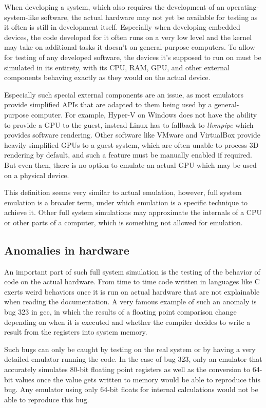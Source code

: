 When developing a system, which also requires the development of an operating-system-like
software, the actual hardware may not yet be available for testing
as it often is still in development itself.
Especially when developing embedded devices,
the code developed for it often runs on a very low level
and the kernel may take on additional tasks it doesn't on general-purpose computers.
To allow for testing of any developed software,
the devices it's supposed to run on must be simulated in its entirety,
with its CPU, RAM, GPU, and other external components behaving exactly as they would on the actual device.

Especially such special external components are an issue,
as most emulators provide simplified APIs that are adapted to them being used by a general-purpose computer.
For example, Hyper-V on Windows does not have the ability to provide a GPU to the guest,
instead Linux has to fallback to \emph{llvmpipe} which provides software rendering.
Other software like VMware and VirtualBox provide heavily simplified GPUs to a guest system,
which are often unable to process 3D rendering by default,
and such a feature must be manually enabled if required.
But even then, there is no option to emulate an actual GPU which may be used on a physical device.

This definition seems very similar to actual emulation,
however, full system emulation is a broader term, under which emulation is a specific technique to achieve it.
Other full system simulations may approximate the internals of a CPU or other parts of a computer,
which is something not allowed for emulation.

\subsection{Anomalies in hardware}
An important part of such full system simulation is the testing of the behavior of code on the actual hardware.
From time to time code written in languages like C exerts weird behaviors once it is run on actual hardware
that are not explainable when reading the documentation.
A very famous example of such an anomaly is bug 323\cite{323} in gcc,
in which the results of a floating point comparison change depending on when it is executed
and whether the compiler decides to write a result from the registers into system memory.

Such bugs can only be caught by testing on the real system
or by having a very detailed emulator running the code.
In the case of bug 323, only an emulator that accurately simulates 80-bit floating point registers
as well as the conversion to 64-bit values once the value gets written to memory
would be able to reproduce this bug.
Any emulator using only 64-bit floats for internal calculations would not be able to reproduce this bug.

